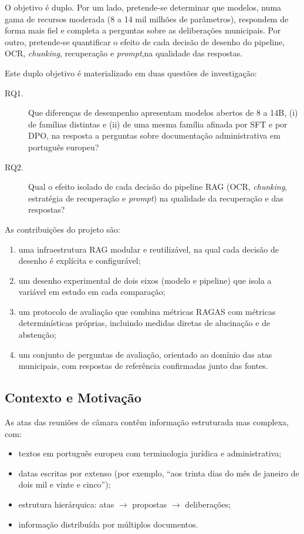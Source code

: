 \documentclass[11pt]{article}
\renewcommand{\_}{\textunderscore\allowbreak}
\begin{document}
O objetivo é duplo. Por um lado, pretende-se determinar que modelos, numa gama de recursos moderada (8 a 14 mil milhões de parâmetros), respondem de forma mais fiel e completa a perguntas sobre as deliberações municipais. Por outro, pretende-se quantificar o efeito de cada decisão de desenho do pipeline, OCR, \textit{chunking}, recuperação e \textit{prompt},na qualidade das respostas.

Este duplo objetivo é materializado em duas questões de investigação:


\begin{description}
    \item[RQ1.] Que diferenças de desempenho apresentam modelos abertos de 8 a 14B, (i) de famílias distintas e (ii) de uma mesma família afinada por SFT e por DPO, na resposta a perguntas sobre documentação administrativa em português europeu?
    \item[RQ2.] Qual o efeito isolado de cada decisão do pipeline RAG (OCR, \textit{chunking}, estratégia de recuperação e \textit{prompt}) na qualidade da recuperação e das respostas?
\end{description}

As contribuições do projeto são:

\begin{enumerate}
    \item uma infraestrutura RAG modular e reutilizável, na qual cada decisão de desenho é explícita e configurável;
    \item um desenho experimental de dois eixos (modelo e pipeline) que isola a variável em estudo em cada comparação;
    \item um protocolo de avaliação que combina métricas RAGAS com métricas determinísticas próprias, incluindo medidas diretas de alucinação e de abstenção;
    \item um conjunto de perguntas de avaliação, orientado ao domínio das atas municipais, com respostas de referência confirmadas junto das fontes.
\end{enumerate}

\subsection{Contexto e Motivação}

As atas das reuniões de câmara contêm informação estruturada mas complexa, com:
\begin{itemize}
    \item textos em português europeu com terminologia jurídica e administrativa;
    \item datas escritas por extenso (por exemplo, ``aos trinta dias do mês de janeiro de dois mil e vinte e cinco'');
    \item estrutura hierárquica: atas $\rightarrow$ propostas $\rightarrow$ deliberações;
    \item informação distribuída por múltiplos documentos.
\end{itemize}
\end{document}
